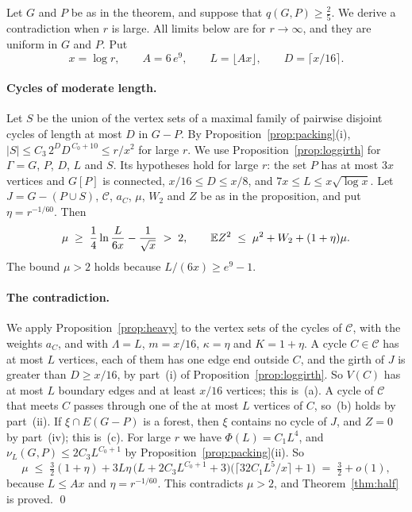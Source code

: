 Let $G$ and $P$ be as in the theorem, and suppose that $q(G,P)\ge\frac25$. We derive a
contradiction when $r$ is large. All limits below are for $r\to\infty$, and they are uniform in
$G$ and $P$. Put
\[
  x=\log r,\qquad A=6\,e^{9},\qquad L=\lfloor Ax\rfloor,\qquad D=\lceil x/16\rceil .
\]

\paragraph{Cycles of moderate length.}
Let $S$ be the union of the vertex sets of a maximal family of pairwise disjoint cycles of length
at most $D$ in $G-P$. By Proposition~\ref{prop:packing}(i),
$|S|\le C_3\,2^{D}D^{\,C_0+10}\le r/x^{2}$ for large $r$. We use
Proposition~\ref{prop:loggirth} for $\Gamma=G$, $P$, $D$, $L$ and $S$. Its hypotheses hold for
large $r$: the set $P$ has at most $3x$ vertices and $G[P]$ is connected, $x/16\le D\le x/8$, and
$7x\le L\le x\sqrt{\log x}$. Let $J=G-(P\cup S)$, $\mathcal C$, $a_C$, $\mu$, $W_2$ and $Z$ be as
in the proposition, and put $\eta=r^{-1/60}$. Then
\[
  \mu\;\ge\;\frac14\ln\frac{L}{6x}-\frac1{\sqrt x}\;>\;2,\qquad
  \mathbb{E} Z^{2}\;\le\;\mu^{2}+W_2+(1+\eta)\mu .
\]
The bound $\mu>2$ holds because $L/(6x)\ge e^{9}-1$.

\paragraph{The contradiction.}
We apply Proposition~\ref{prop:heavy} to the vertex sets of the cycles of $\mathcal C$, with the
weights $a_C$, and with $\Lambda=L$, $m=x/16$, $\kappa=\eta$ and $K=1+\eta$. A cycle
$C\in\mathcal C$ has at most $L$ vertices, each of them has one edge end outside $C$, and the
girth of $J$ is greater than $D\ge x/16$, by part~(i) of Proposition~\ref{prop:loggirth}. So
$V(C)$ has at most $L$ boundary edges and at least $x/16$ vertices; this is~(a). A cycle of
$\mathcal C$ that meets $C$ passes through one of the at most $L$ vertices of $C$, so~(b) holds
by part~(ii). If $\xi\cap E(G-P)$ is a forest, then $\xi$ contains no cycle of $J$, and $Z=0$
by part~(iv); this is~(c). For large $r$ we have
$\Phi(L)=C_1L^{4}$, and $\nu_L(G,P)\le2C_3L^{C_0+1}$ by Proposition~\ref{prop:packing}(ii). So
\[
  \mu\;\le\;\tfrac32(1+\eta)+3L\eta\,\bigl(L+2C_3L^{C_0+1}+3\bigr)
  \bigl(\lceil32C_1L^{5}/x\rceil+1\bigr)\;=\;\tfrac32+o(1),
\]
because $L\le Ax$ and $\eta=r^{-1/60}$. This contradicts $\mu>2$, and
Theorem~\ref{thm:half} is proved. \qed
